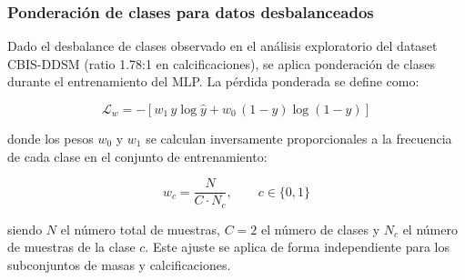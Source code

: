 
\subsubsection{Ponderación de clases para datos desbalanceados}

Dado el desbalance de clases observado en el análisis
exploratorio del dataset CBIS-DDSM (ratio 1.78:1 en
calcificaciones), se aplica ponderación de clases durante
el entrenamiento del MLP. La pérdida ponderada se define
como:

\begin{equation}
  \mathcal{L}_w = -\left[
  w_1\,y\log\hat{y} +
  w_0\,(1-y)\log(1-\hat{y})
  \right]
  \label{eq:weighted_bce}
\end{equation}

\noindent donde los pesos $w_0$ y $w_1$ se calculan
inversamente proporcionales a la frecuencia de cada clase
en el conjunto de entrenamiento:

\begin{equation}
  w_c = \frac{N}{C \cdot N_c}, \qquad c \in \{0, 1\}
  \label{eq:class_weights}
\end{equation}

\noindent siendo $N$ el número total de muestras, $C = 2$
el número de clases y $N_c$ el número de muestras de la
clase $c$. Este ajuste se aplica de forma independiente
para los subconjuntos de masas y calcificaciones.
